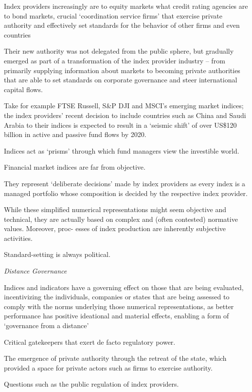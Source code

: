 \documentclass[
]{book}
\begin{document}
Index providers increasingly are
to equity markets what credit rating agencies are to bond markets, crucial
`coordination service firms' that exercise private authority and effectively
set standards for the behavior of other firms and even countries

Their new authority was not delegated from
the public sphere, but gradually emerged as part of a transformation of the index
provider industry -- from primarily supplying information about markets to
becoming private authorities that are able to set standards on corporate governance and
steer international capital flows.

Take for example FTSE Russell, S\&P DJI and
MSCI's emerging market indices; the index providers' recent decision to include
countries such as China and Saudi Arabia to their indices is expected to result in a
`seismic shift' of over US\$120 billion in active and passive fund flows by 2020.

Indices act as `prisms' through which fund managers view the investible world.

Financial market indices are far from objective.

They represent `deliberate decisions'
made by index providers as every index is a managed portfolio whose composition
is decided by the respective index provider.

While these
simplified numerical representations might seem objective and technical, they are
actually based on complex and (often contested) normative values. Moreover, proc-
esses of index production are inherently subjective activities.

Standard-setting is always political.

\emph{Distance Governance}

Indices and indicators have a governing effect on those that are being evaluated,
incentivizing the individuals, companies or states that are being assessed
to comply with the norms underlying those numerical representations,
as better performance has positive ideational and material effects,
enabling a form of `governance from a distance'

Critical gatekeepers that exert de facto regulatory power.

The emergence of private authority through the retreat of the state,
which provided a space for private actors such as firms to exercise authority.

Questions such as the public regulation of index providers.
\end{document}
